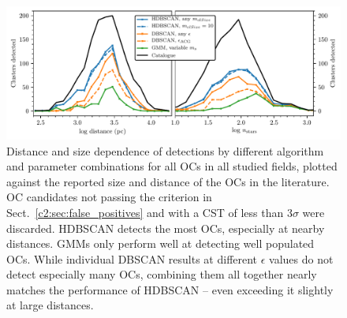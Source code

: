 \begin{figure}[ht]
   \centering
   \includegraphics[width=\textwidth]{fig/c2/fig_crossmatches.pdf}
   \caption[Distance and size dependence of detections by different algorithm and parameter combinations for all 1385 OCs in all studied fields]{Distance and size dependence of detections by different algorithm and parameter combinations for all  OCs in all studied fields, plotted against the reported size and distance of the OCs in the literature. OC candidates not passing the criterion in Sect.~\ref{c2:sec:false_positives} and with a CST of less than 3$\sigma$ were discarded. HDBSCAN detects the most OCs, especially at nearby distances. GMMs only perform well at detecting well populated OCs. While individual DBSCAN results at different $\epsilon$ values do not detect especially many OCs, combining them all together nearly matches the performance of HDBSCAN -- even exceeding it slightly at large distances.}\label{c2:fig:detections_by_distance}%
\end{figure}

